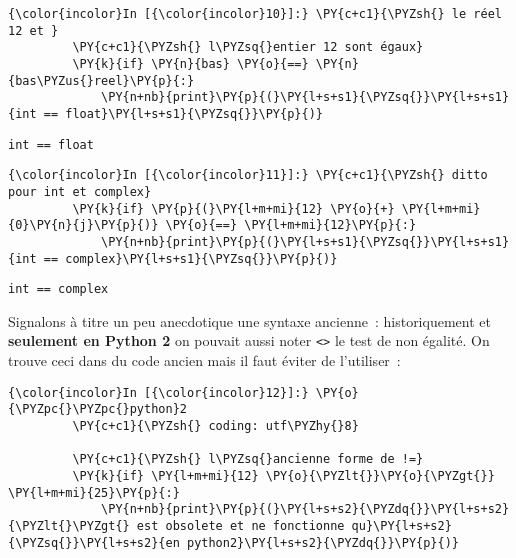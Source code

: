     \begin{Verbatim}[commandchars=\\\{\}]
{\color{incolor}In [{\color{incolor}10}]:} \PY{c+c1}{\PYZsh{} le réel 12 et }
         \PY{c+c1}{\PYZsh{} l\PYZsq{}entier 12 sont égaux}
         \PY{k}{if} \PY{n}{bas} \PY{o}{==} \PY{n}{bas\PYZus{}reel}\PY{p}{:}
             \PY{n+nb}{print}\PY{p}{(}\PY{l+s+s1}{\PYZsq{}}\PY{l+s+s1}{int == float}\PY{l+s+s1}{\PYZsq{}}\PY{p}{)}
\end{Verbatim}


    \begin{Verbatim}[commandchars=\\\{\}]
int == float

    \end{Verbatim}

    \begin{Verbatim}[commandchars=\\\{\}]
{\color{incolor}In [{\color{incolor}11}]:} \PY{c+c1}{\PYZsh{} ditto pour int et complex}
         \PY{k}{if} \PY{p}{(}\PY{l+m+mi}{12} \PY{o}{+} \PY{l+m+mi}{0}\PY{n}{j}\PY{p}{)} \PY{o}{==} \PY{l+m+mi}{12}\PY{p}{:}
             \PY{n+nb}{print}\PY{p}{(}\PY{l+s+s1}{\PYZsq{}}\PY{l+s+s1}{int == complex}\PY{l+s+s1}{\PYZsq{}}\PY{p}{)}
\end{Verbatim}


    \begin{Verbatim}[commandchars=\\\{\}]
int == complex

    \end{Verbatim}

    Signalons à titre un peu anecdotique une syntaxe ancienne~:
historiquement et \textbf{seulement en Python 2} on pouvait aussi noter
\texttt{\textless{}\textgreater{}} le test de non égalité. On trouve
ceci dans du code ancien mais il faut éviter de l'utiliser~:

    \begin{Verbatim}[commandchars=\\\{\}]
{\color{incolor}In [{\color{incolor}12}]:} \PY{o}{\PYZpc{}\PYZpc{}python}2
         \PY{c+c1}{\PYZsh{} coding: utf\PYZhy{}8}
         
         \PY{c+c1}{\PYZsh{} l\PYZsq{}ancienne forme de !=}
         \PY{k}{if} \PY{l+m+mi}{12} \PY{o}{\PYZlt{}}\PY{o}{\PYZgt{}} \PY{l+m+mi}{25}\PY{p}{:}
             \PY{n+nb}{print}\PY{p}{(}\PY{l+s+s2}{\PYZdq{}}\PY{l+s+s2}{\PYZlt{}\PYZgt{} est obsolete et ne fonctionne qu}\PY{l+s+s2}{\PYZsq{}}\PY{l+s+s2}{en python2}\PY{l+s+s2}{\PYZdq{}}\PY{p}{)}
\end{Verbatim}


